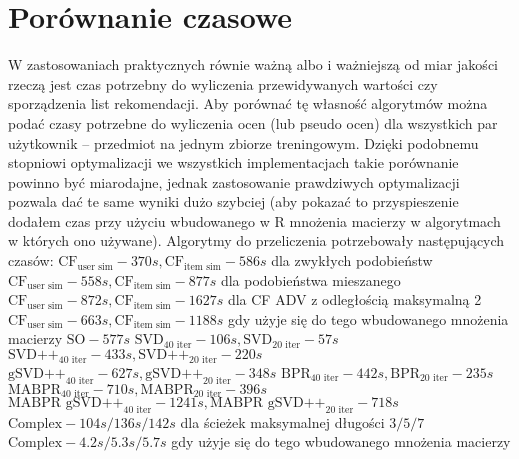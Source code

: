 \documentclass{pracamgr}
\begin{document}
   \section{Porównanie czasowe}
    W zastosowaniach praktycznych równie ważną albo i ważniejszą od miar jakości rzeczą jest czas potrzebny do wyliczenia przewidywanych wartości
    czy sporządzenia list rekomendacji. Aby porównać tę własność algorytmów można podać czasy potrzebne do wyliczenia ocen (lub pseudo ocen)
    dla wszystkich par użytkownik -- przedmiot na jednym zbiorze treningowym. Dzięki podobnemu stopniowi optymalizacji we wszystkich implementacjach
    takie porównanie powinno być miarodajne, jednak zastosowanie prawdziwych optymalizacji pozwala dać te same wyniki dużo szybciej
    (aby pokazać to przyspieszenie dodałem czas przy użyciu wbudowanego w R mnożenia macierzy w algorytmach w których ono używane).
    Algorytmy do przeliczenia potrzebowały następujących czasów:\newline
    $\text{CF}_{\text{user sim}} - 370s, \text{CF}_{\text{item sim}} - 586s$ dla zwykłych podobieństw\newline
    $\text{CF}_{\text{user sim}} - 558s, \text{CF}_{\text{item sim}} - 877s$ dla podobieństwa mieszanego\newline
    $\text{CF}_{\text{user sim}} - 872s, \text{CF}_{\text{item sim}} - 1627s$ dla CF ADV z odległością maksymalną 2\newline
    $\text{CF}_{\text{user sim}} - 663s, \text{CF}_{\text{item sim}} - 1188s$ gdy użyje się do tego wbudowanego mnożenia macierzy\newline 
    $\text{SO} - 577s$\newline
    $\text{SVD}_{\text{40 iter}} - 106s, \text{SVD}_{\text{20 iter}} - 57s$\newline
    $\text{SVD++}_{\text{40 iter}} - 433s, \text{SVD++}_{\text{20 iter}} - 220s$\newline
    $\text{gSVD++}_{\text{40 iter}} - 627s, \text{gSVD++}_{\text{20 iter}} - 348s$\newline
    $\text{BPR}_{\text{40 iter}} - 442s, \text{BPR}_{\text{20 iter}} - 235s$\newline
    $\text{MABPR}_{\text{40 iter}} - 710s, \text{MABPR}_{\text{20 iter}} - 396s$\newline
    $\text{MABPR gSVD++}_{\text{40 iter}} - 1241s, \text{MABPR gSVD++}_{\text{20 iter}} - 718s$\newline
    $\text{Complex} - 104s/136s/142s$ dla ścieżek maksymalnej długości $3/5/7$\newline
    $\text{Complex} - 4.2s/5.3s/5.7s$ gdy użyje się do tego wbudowanego mnożenia macierzy\newline
    
\end{document}
